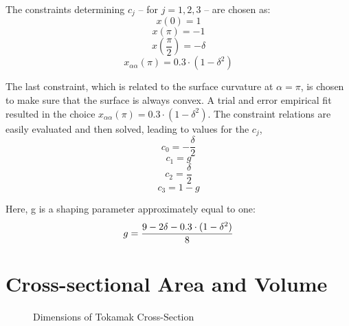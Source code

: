 The constraints determining $c_j$ -- for $j = 1,2,3$ -- are chosen as:
\begin{equation}
	x(0) = 1
\end{equation}
\begin{equation}
	x(\pi) = -1
\end{equation}
\begin{equation}
	x\left(\frac{\pi}{2}\right) = -\delta
\end{equation}
\begin{equation}
	x_{\alpha\alpha}(\pi) = 0.3 \cdot ( 1 - \delta ^2 )
\end{equation}

The last constraint, which is related to the surface curvature at $\alpha = \pi$, is chosen to make sure that the surface is always convex. A trial and error empirical fit resulted in the choice $x_{\alpha\alpha}(\pi) = 0.3 \cdot ( 1 - \delta ^2 )$. The constraint relations are easily evaluated and then solved, leading to values for the $c_j$,
\begin{equation}
	c_0 = { - \frac{ \delta }{ 2 } }
\end{equation}
\begin{equation}
	c_1 = g
\end{equation}
\begin{equation}
	c_2 = { \frac{ \delta }{ 2 } }
\end{equation}
\begin{equation}
	c_3 = 1 - g
\end{equation}

Here, g is a shaping parameter approximately equal to one:
\begin{equation}
	g = \frac{9 - 2 \delta - 0.3 \cdot ( 1 - \delta ^2 ) }{8}
	\myequations{Shaping Parameter -- $g$}
\end{equation}

\section{Cross-sectional Area and Volume}

\begin{figure}
\centering

\caption{Dimensions of Tokamak Cross-Section}
\label{fig:dims}
\end{figure}

